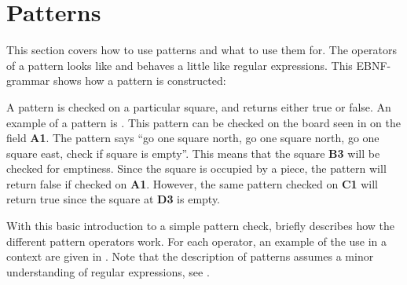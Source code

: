 \section{Patterns}
\label{sec:patterns}

This section covers how to use patterns and what to use them for. The operators
of a pattern looks like and behaves a little like regular expressions. This
EBNF-grammar shows how a pattern is constructed:

\begin{ebnf}
\end{ebnf}


A pattern is checked on a particular square, and returns either true or false.
An example of a pattern is . This pattern can be checked on
the board seen in  on the field \textbf{A1}. The pattern
says ``go one square north, go one square north, go one square east, check if
square is empty''. This means that the square \textbf{B3} will be checked for
emptiness. Since the square is occupied by a piece, the pattern will return
false if checked on \textbf{A1}. However, the same pattern checked on
\textbf{C1} will return true since the square at \textbf{D3} is empty.


With this basic introduction to a simple pattern check,
 briefly describes how the different pattern
operators work. For each operator, an example of the use in a context are given
in . Note that the description of patterns assumes a
minor understanding of regular expressions, see \cite{regex}.

